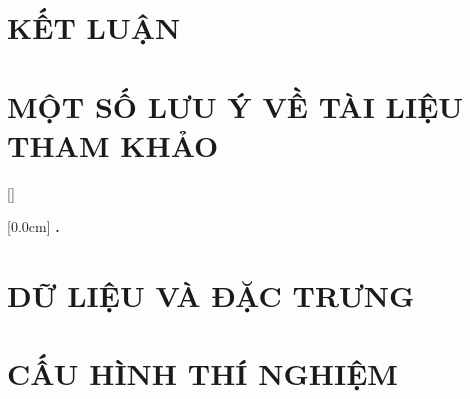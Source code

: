 \documentclass[a4paper,13pt,3p,twoside]{report}
\renewcommand{\bibname}{Danh_sach_tai_lieu_tham_khao}
\theoremstyle{definition}
\begin{document}
\newpage
\chapter{KẾT LUẬN}


\newpage
\chapter*{MỘT SỐ LƯU Ý VỀ TÀI LIỆU THAM KHẢO} %
\label{chapter:reference}


\newpage
\renewcommand\bibname{TÀI LIỆU THAM KHẢO}
\nocite{*}   %
\printbibliography
{}

\appendixpage
\appendix
\addappheadtotoc

[]
\titlespacing*{\chapter}{0pt}{-20pt}{20pt}

    [0.0cm]             %
    {\bfseries\vspace{0.3cm}}                  %
    {{\bfseries{\scshape} \thecontentslabel.\ }} %
    {}         %
    {\contentspage} 
    
\chapter{DỮ LIỆU VÀ ĐẶC TRƯNG}


\newpage
\chapter{CẤU HÌNH THÍ NGHIỆM}

\end{document}
